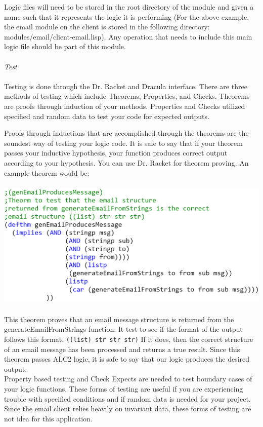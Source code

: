 \documentclass[11pt, letterpaper]{report}
\begin{document}
\begin{description}
Logic files will need to be stored in the root directory of the module and given a name such that it represents the logic it is performing (For the above example, the email module on the client is stored in the following directory: modules/email/client-email.lisp). Any operation that needs to include this main logic file should be part of this module.\\\\
\textit{Test}\\\\
Testing is done through the Dr. Racket and Dracula interface. There are three methods of testing which include Theorems, Properties, and Checks. Theorems are proofs through induction of your methods. Properties and Checks utilized specified and random data to test your code for expected outputs. 

Proofs through inductions that are accomplished through the theorems are the soundest way of testing your logic code. It is safe to say that if your theorem passes your inductive hypothesis, your function produces correct output according to your hypothesis.  You can use Dr. Racket for theorem proving. An example theorem would be:\\\\
\includegraphics[scale=0.35]{clienttest}\\\\
This theorem proves that an email message structure is returned from the generateEmailFromStrings function. It test to see if the format of the output follows this format. \verb$((list) str str str)$ If it does, then the correct structure of an email message has been processed and returns a true result. Since this theorem passes ALC2 logic, it is safe to say that our logic produces the desired output.\\ 

Property based testing and Check Expects are needed to test boundary cases of your logic functions. These forms of testing are useful if you are experiencing trouble with specified conditions and if random data is needed for your project. Since the email client relies heavily on invariant data, these forms of testing are not idea for this application.\\


\end{description}
\end{document}
